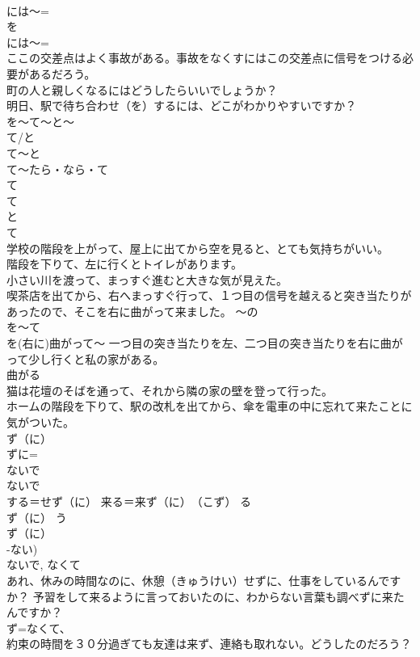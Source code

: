 \documentclass[8pt]{extreport}
\begin{document}
\begin{CJK}{UTF8}{min}
\\	には～=
\\	を
\\	には～=
\\	ここの交差点はよく事故がある。事故をなくすにはこの交差点に信号をつける必要があるだろう。 
\\	町の人と親しくなるにはどうしたらいいでしょうか？ 
\\	明日、駅で待ち合わせ（を）するには、どこがわかりやすいですか？
\\	を～て～と～	
\\	て/と 
\\	て～と
\\	て～たら・なら・て
\\	て
\\	て
\\	と
\\	て
\\	学校の階段を上がって、屋上に出てから空を見ると、とても気持ちがいい。 
\\	階段を下りて、左に行くとトイレがあります。 
\\	小さい川を渡って、まっすぐ進むと大きな気が見えた。 
\\	喫茶店を出てから、右へまっすぐ行って、１つ目の信号を越えると突き当たりがあったので、そこを右に曲がって来ました。 ～の
\\	を～て 
\\	を(右に)曲がって～ 一つ目の突き当たりを左、二つ目の突き当たりを右に曲がって少し行くと私の家がある。 
\\	曲がる 
\\	猫は花壇のそばを通って、それから隣の家の壁を登って行った。 
\\	ホームの階段を下りて、駅の改札を出てから、傘を電車の中に忘れて来たことに気がついた。 
\\	ず（に）	
\\	ずに=
\\	ないで 
\\	ないで
\\	する＝せず（に） 来る＝来ず（に）　（こず） る
\\	ず（に） う
\\	ず（に） 
\\	-ない) 
\\	ないで, なくて 
\\	あれ、休みの時間なのに、休憩（きゅうけい）せずに、仕事をしているんですか？ 予習をして来るように言っておいたのに、わからない言葉も調べずに来たんですか？ 
\\	ず=なくて、 
\\	約束の時間を３０分過ぎても友達は来ず、連絡も取れない。どうしたのだろう？ 

\end{CJK}
\end{document}
